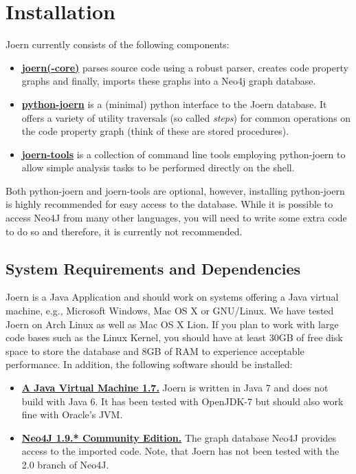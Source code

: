 \documentclass[a4paper]{article}
\begin{document}
\section{Installation}
\label{sec:installation}

Joern currently consists of the following components:

\begin{itemize}

\item \textbf{\href{https://github.com/fabsx00/joern/}{joern(-core)}}
  parses source code using a robust parser, creates code property graphs
  and finally, imports these graphs into a Neo4j graph database.
  
\item
  \textbf{\href{https://github.com/fabsx00/python-joern/}{python-joern}}
  is a (minimal) python interface to the Joern database. It offers a
  variety of utility traversals (so called \emph{steps}) for common
  operations on the code property graph (think of these are stored
  procedures).
  
\item \textbf{\href{https://github.com/fabsx00/joern-tools/}{joern-tools}}
  is a collection of command line tools employing python-joern to
  allow simple analysis tasks to be performed directly on the shell. 
  
\end{itemize}

Both python-joern and joern-tools are optional, however, installing
python-joern is highly recommended for easy access to the
database. While it is possible to access Neo4J from many other
languages, you will need to write some extra code to do so and
therefore, it is currently not recommended.

\subsection{System Requirements and Dependencies}

Joern is a Java Application and should work on systems offering a Java
virtual machine, e.g., Microsoft Windows, Mac OS X or GNU/Linux. We
have tested Joern on Arch Linux as well as Mac OS X Lion. If you plan
to work with large code bases such as the Linux Kernel, you should
have at least 30GB of free disk space to store the database and 8GB of
RAM to experience acceptable performance. In addition, the following
software should be installed:

\begin{itemize}
\item \textbf{\href{http://www.java.com/}{A Java Virtual Machine
      1.7.}} Joern is written in Java 7 and does not build with Java 6. It
  has been tested with OpenJDK-7 but should also work fine with Oracle's
  JVM.
  
\item
  \textbf{\href{http://www.neo4j.org/download/other\_versions}{Neo4J
      1.9.* Community Edition.}} The graph database Neo4J provides access to
  the imported code. Note, that Joern has not been tested with the 2.0
  branch of Neo4J.
  
\end{itemize}
\end{document}
